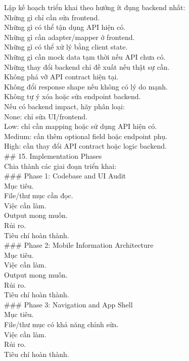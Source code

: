 \begin{enumerate}
Lập kế hoạch triển khai theo hướng ít đụng backend nhất: \\
\* Những gì chỉ cần sửa frontend. \\
\* Những gì có thể tận dụng API hiện có. \\
\* Những gì cần adapter/mapper ở frontend. \\
\* Những gì có thể xử lý bằng client state. \\
\* Những gì cần mock data tạm thời nếu API chưa có. \\
\* Những thay đổi backend chỉ đề xuất nếu thật sự cần. \\
\* Không phá vỡ API contract hiện tại. \\
\* Không đổi response shape nếu không có lý do mạnh. \\
\* Không tự ý xóa hoặc sửa endpoint backend. \\


Nếu có backend impact, hãy phân loại: \\
\* None: chỉ sửa UI/frontend. \\
\* Low: chỉ cần mapping hoặc sử dụng API hiện có. \\
\* Medium: cần thêm optional field hoặc endpoint phụ. \\
\* High: cần thay đổi API contract hoặc logic backend. \\


\#\# 15. Implementation Phases \\

Chia thành các giai đoạn triển khai: \\

\#\#\# Phase 1: Codebase and UI Audit \\
\* Mục tiêu. \\
\* File/thư mục cần đọc. \\
\* Việc cần làm. \\
\* Output mong muốn. \\
\* Rủi ro. \\
\* Tiêu chí hoàn thành. \\


\#\#\# Phase 2: Mobile Information Architecture \\
\* Mục tiêu. \\
\* Việc cần làm. \\
\* Output mong muốn. \\
\* Rủi ro. \\
\* Tiêu chí hoàn thành. \\


\#\#\# Phase 3: Navigation and App Shell \\
\* Mục tiêu. \\
\* File/thư mục có khả năng chỉnh sửa. \\
\* Việc cần làm. \\
\* Rủi ro. \\
\* Tiêu chí hoàn thành. \\



\end{enumerate}
